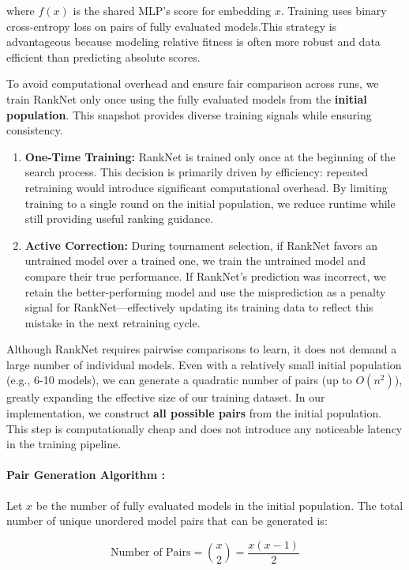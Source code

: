 where $f(x)$ is the shared MLP's score for embedding $x$. Training uses binary cross-entropy loss on pairs of fully evaluated models.This strategy is advantageous because modeling relative fitness is often more robust
and data efficient than predicting absolute scores.


To avoid computational overhead and ensure fair comparison across runs, we train RankNet only once using the fully evaluated models from the \textbf{initial population}. This snapshot provides diverse training signals while ensuring consistency.

\begin{enumerate}
    \item \textbf{One-Time Training:} RankNet is trained only once at the beginning of the search process. This decision is primarily driven by efficiency: repeated retraining would introduce significant computational overhead. By limiting training to a single round on the initial population, we reduce runtime while still providing useful ranking guidance.

    \item \textbf{Active Correction:} During tournament selection, if RankNet favors an untrained model over a trained one, we train the untrained model and compare their true performance. If RankNet’s prediction was incorrect, we retain the better-performing model and use the misprediction as a penalty signal for RankNet—effectively updating its training data to reflect this mistake in the next retraining cycle.
\end{enumerate}

Although RankNet requires pairwise comparisons to learn, it does not demand a large number of individual models. Even with a relatively small initial population (e.g., 6-10 models), we can generate a quadratic number of pairs (up to $O(n^2)$), greatly expanding the effective size of our training dataset. In our implementation, we construct \textbf{all possible pairs} from the initial population. This step is computationally cheap and does not introduce any noticeable latency in the training pipeline.

\paragraph{Pair Generation Algorithm :}
Let $x$ be the number of fully evaluated models in the initial population. The total number of unique unordered model pairs that can be generated is:

\[
\text{Number of Pairs} = \binom{x}{2} = \frac{x(x - 1)}{2}
\]

